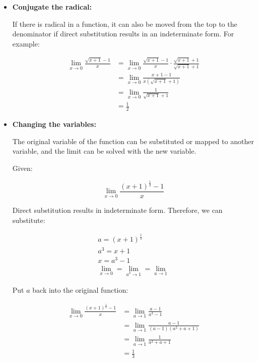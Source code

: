 \documentclass[12pt]{article}
\begin{document}
\begin{itemize}
    \item \textbf{Conjugate the radical:}

    If there is radical in a function, it can also be moved from the top to the denominator if direct substitution results in an indeterminate form. For example:

    \begin{align*}
        \lim_{x \to 0} \frac{\sqrt{x + 1} - 1}{x} &= \lim_{x \to 0} \frac{\sqrt{x + 1} - 1}{x} \cdot \frac{\sqrt{x + 1} + 1}{\sqrt{x + 1} + 1} \\[6pt]
        &= \lim_{x \to 0} \frac{x + 1 - 1}{x \left( \sqrt{x + 1} + 1 \right)} \\[6pt]
        &= \lim_{x \to 0} \frac{1}{\sqrt{x + 1} + 1} \\[6pt]
        &= \frac{1}{2}
    \end{align*}

    \item \textbf{Changing the variables:}

    The original variable of the function can be substituted or mapped to another variable, and the limit can be solved with the new variable.

    Given:

    \[ \lim_{x \to 0} \frac{(x + 1)^{\frac{1}{3}} - 1}{x} \]

    Direct substitution results in indeterminate form. Therefore, we can substitute:

    \begin{gather*}
        a = (x + 1)^{\frac{1}{3}} \\
        a^3 = x + 1 \\
        x = a^3 - 1 \\
        \lim_{x \to 0} = \lim_{a^3 \to 1} = \lim_{a \to 1}
    \end{gather*}

    Put $a$ back into the original function:

    \begin{align*}
        \lim_{x \to 0} \frac{(x + 1)^{\frac{1}{3}} - 1}{x} &= \lim_{a \to 1} \frac{a - 1}{a^3 - 1} \\[6pt]
        &= \lim_{a \to 1} \frac{a - 1}{(a - 1)(a^2 + a + 1)} \\[6pt]
        &= \lim_{a \to 1} \frac{1}{a^2 + a + 1} \\[6pt]
        &= \frac{1}{3}
    \end{align*}


\end{itemize}
\end{document}
